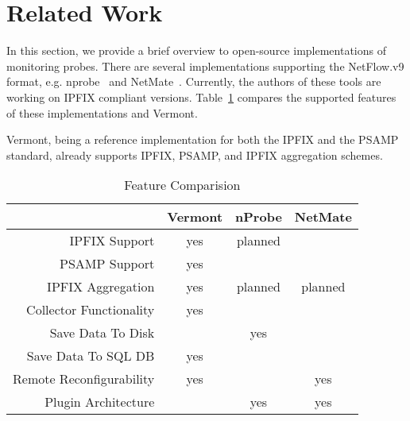 \section{Related Work}
\label{sec:related-work}


In this section, we provide a brief overview to open-source implementations of monitoring probes.
There are several implementations supporting the NetFlow.v9 format, e.g. nprobe~\cite{deri2003nprobe} and NetMate~\cite{schmoll2004netmate}. Currently, the authors of these tools are working on IPFIX compliant versions.
Table~\ref{tab:features} compares the supported features of these implementations and Vermont.

Vermont, being a reference implementation for both the IPFIX and the PSAMP standard, already supports IPFIX, PSAMP, and IPFIX aggregation schemes.

\begin{table}
\renewcommand{\arraystretch}{1.0}
\caption{Feature Comparision}
\label{tab:features}
\begin{center}
\begin{tabular}{r|c|c|c}
 & Vermont & nProbe & NetMate\\
\hline
IPFIX Support & yes & planned & \\
PSAMP Support & yes &  & \\
IPFIX Aggregation & yes & planned & planned\\
Collector Functionality & yes &  & \\
Save Data To Disk &  & yes & \\
Save Data To SQL DB & yes & & \\
Remote Reconfigurability & yes &  & yes\\
Plugin Architecture &  & yes & yes\\
\hline
\end{tabular}
\end{center}
\end{table}

